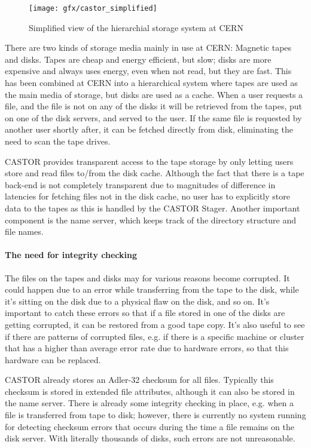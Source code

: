 \begin{figure}[ht]
\centering
\texttt{[image: gfx/castor\_simplified]}
\caption{Simplified view of the hierarchial storage system at CERN}
\label{fig:castor}
\end{figure}

There are two kinds of storage media mainly in use at CERN: Magnetic tapes and disks. Tapes are cheap and energy efficient, but slow; disks are more expensive and always uses energy, even when not read, but they are fast. This has been combined at CERN into a hierarchical system where tapes are used as the main media of storage, but disks are used as a cache. When a user requests a file, and the file is not on any of the disks it will be retrieved from the tapes, put on one of the disk servers, and served to the user. If the same file is requested by another user shortly after, it can be fetched directly from disk, eliminating the need to scan the tape drives.

CASTOR provides transparent access to the tape storage by only letting users store and read files to/from the disk cache. Although the fact that there is a tape back-end is not completely transparent due to magnitudes of difference in latencies for fetching files not in the disk cache, no user has to explicitly store data to the tapes as this is handled by the CASTOR Stager. Another important component is the name server, which keeps track of the directory structure and file names.

\paragraph{The need for integrity checking}
The files on the tapes and disks may for various reasons become corrupted. It could happen due to an error while transferring from the tape to the disk, while it's sitting on the disk due to a physical flaw on the disk, and so on. It's important to catch these errors so that if a file stored in one of the disks are getting corrupted, it can be restored from a good tape copy. It's also useful to see if there are patterns of corrupted files, e.g. if there is a specific machine or cluster that has a higher than average error rate due to hardware errors, so that this hardware can be replaced.

CASTOR already stores an Adler-32 checksum for all files. Typically this checksum is stored in extended file attributes, although it can also be stored in the name server. There is already some integrity checking in place, e.g. when a file is transferred from tape to disk; however, there is currently no system running for detecting checksum errors that occurs during the time a file remains on the disk server. With literally thousands of disks, such errors are not unreasonable. 

